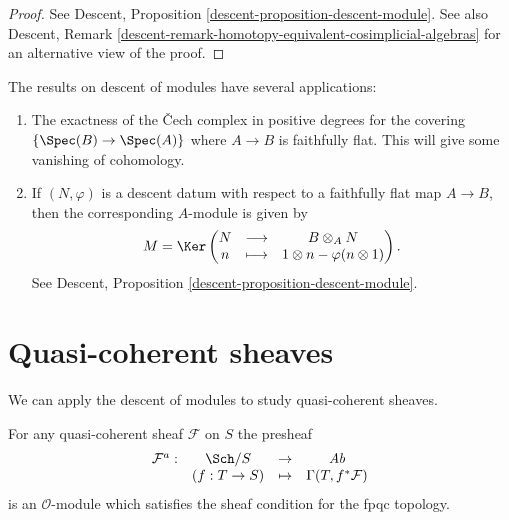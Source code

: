 \begin{proof}
See
Descent, Proposition \ref{descent-proposition-descent-module}.
See also
Descent, Remark \ref{descent-remark-homotopy-equivalent-cosimplicial-algebras}
for an alternative view of the proof.
\end{proof}

\begin{remarks}
\label{remarks-theorem-modules-exactness}
The results on descent of modules have several applications:
\begin{enumerate}
\item The exactness of the {\v C}ech complex in positive degrees for
the covering $\{\Spec(B) \to \Spec(A)\}$ where $A \to B$ is
faithfully flat. This will give some vanishing of cohomology.
\item If $(N, \varphi)$ is a descent datum with respect to a faithfully
flat map $A \to B$, then the corresponding $A$-module is given by
$$
M = \Ker \left(
\begin{matrix}
N & \longrightarrow & B \otimes_A N \\
n & \longmapsto & 1 \otimes n - \varphi(n \otimes 1)
\end{matrix}
\right).
$$
See
Descent, Proposition \ref{descent-proposition-descent-module}.
\end{enumerate}
\end{remarks}




\section{Quasi-coherent sheaves}
\label{section-quasi-coherent}

\noindent
We can apply the descent of modules to study quasi-coherent sheaves.

\begin{proposition}
\label{proposition-quasi-coherent-sheaf-fpqc}
For any quasi-coherent sheaf $\mathcal{F}$ on $S$ the presheaf
$$
\begin{matrix}
\mathcal{F}^a : & \Sch/S & \to & \textit{Ab}\\
& (f: T \to S) & \mapsto & \Gamma(T, f^*\mathcal{F})
\end{matrix}
$$
is an $\mathcal{O}$-module which satisfies the sheaf condition for the
fpqc topology.
\end{proposition}

